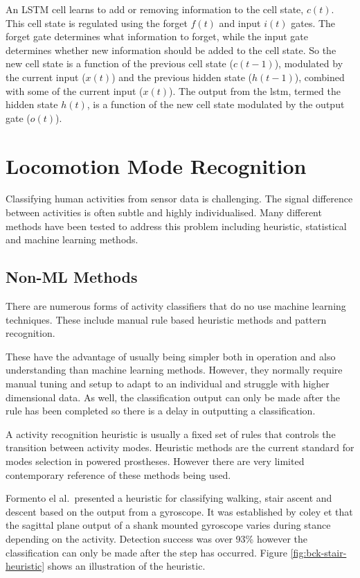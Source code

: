 An LSTM cell learns to add or removing information to the cell state, $c(t)$. This cell state is regulated using the forget $f(t)$ and input $i(t)$ gates. The forget gate determines what information to forget, while the input gate determines whether new information should be added to the cell state. So the new cell state is a function of the previous cell state ($c(t-1)$), modulated by the current input ($x(t)$) and the previous hidden state ($h(t-1)$), combined with some of the current input ($x(t)$). The output from the \acrshort{lstm}, termed the hidden state $h(t)$, is a function of the new cell state modulated by the output gate ($o(t)$).\cite{Lee2021}


\section{Locomotion Mode Recognition}
\label{sec:background-ml-lmr}
Classifying human activities from sensor data is challenging. The signal difference between activities is often subtle and highly individualised.\cite{Zhu2019} Many different methods have been tested to address this problem including heuristic, statistical and machine learning methods.

\subsection{Non-ML Methods}
There are numerous forms of activity classifiers that do no use machine learning techniques. These include manual rule based heuristic methods and pattern recognition.

These have the advantage of usually being simpler both in operation and also understanding than machine learning methods. However, they normally require manual tuning and setup to adapt to an individual and struggle with higher dimensional data\cite{Tucker2015}. As well, the classification output can only be made after the rule has been completed so there is a delay in outputting a classification.

A activity recognition heuristic is usually a fixed set of rules that controls the transition between activity modes. Heuristic methods are the current standard for modes selection in powered prostheses\cite{Varol2008, Lawson2014, Gorsic2014, Young2014a}. However there are very limited contemporary reference of these methods being used.

Formento el al.~presented a heuristic for classifying walking, stair ascent and descent based on the output from a gyroscope. It was established by coley et \cite{Coley2005} that the sagittal plane output of a shank mounted gyroscope varies during stance depending on the activity. Detection success was over 93\% however the classification can only be made after the step has occurred. Figure \ref{fig:bck-stair-heuristic} shows an illustration of the heuristic.\cite{Formento2014}

